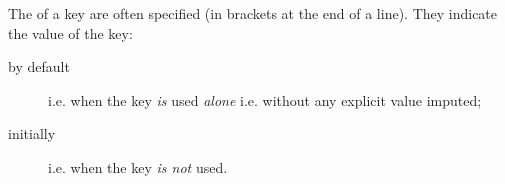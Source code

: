 \documentclass[english,nolocaltoc]{nwejmart}
\newtheorem[style=definition]{fact}
\newtheorem[title-plural=Criteria]{criterion}
\newtheorem[title=random experiment]{rexp}
\begin{document}
The  of a key are often specified (in
brackets at the end of a line). They indicate the value of the key: 
\begin{description}
\item[by default] i.e. when the key \emph{is} used \emph{alone}
  i.e. without any explicit value imputed;
\item[initially] i.e. when the key \emph{is not} used.
\end{description}
%
\printbibliography[category=documentation]
%
%
\printindex
\end{document}
